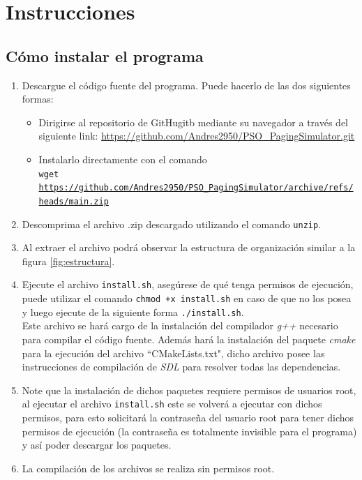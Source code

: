 \documentclass{report}
\begin{document}
\chapter{Instrucciones}
\section{Cómo instalar el programa}
\begin{enumerate}
  \item Descargue el código fuente del programa. Puede hacerlo de las dos siguientes formas:
    \begin{itemize}
      \item Dirigirse al repositorio de GitHugitb mediante su navegador a través del siguiente link: \url{https://github.com/Andres2950/PSO\_PagingSimulator.git}
      \item Instalarlo directamente con el comando \\
    \texttt{wget \url{https://github.com/Andres2950/PSO\_PagingSimulator/archive/refs/heads/main.zip}}
    \end{itemize}
  \item Descomprima el archivo .zip descargado utilizando el comando \texttt{unzip}.
  \item Al extraer el archivo podrá observar la estructura de organización similar a la figura \ref{fig:estructura}.
\item Ejecute el archivo \texttt{install.sh}, asegúrese de qué tenga permisos de ejecución, puede utilizar el comando \texttt{chmod +x install.sh} en caso de que no los posea y luego ejecute de la siguiente forma \texttt{./install.sh}. \\
  Este archivo se hará cargo de la instalación del compilador \textit{g++} necesario para compilar el código fuente. Además hará la instalación del paquete \textit{cmake} para la ejecución del archivo ``CMakeLists.txt", dicho archivo posee las instrucciones de compilación de \textit{SDL} para resolver todas las dependencias. 
\item Note que la instalación de dichos paquetes requiere permisos de usuarios root, al ejecutar el archivo \texttt{install.sh} este se volverá a ejecutar con dichos permisos, para esto solicitará la contraseña del usuario root para tener dichos permisos de ejecución (la contraseña es totalmente invisible para el programa) y así poder descargar los paquetes.
\item La compilación de los archivos se realiza sin permisos root.

\end{enumerate}
\end{document}
